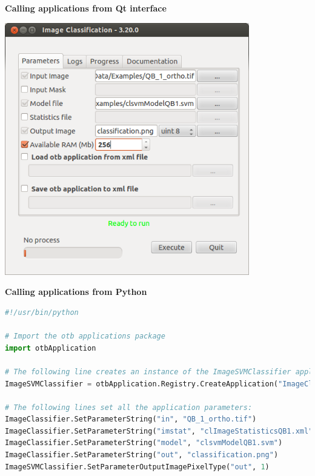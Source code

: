 \documentclass[portrait,a0]{a0poster}
\newenvironment{poster}{
  \begin{center}
  \begin{minipage}[c]{0.99\textwidth}
}{
  \end{minipage} 
  \end{center}
}
\newcommand{\titresubsection}[1]{ 
 	\begin{center}
 	\Large{\textbf{#1}}
 	\end{center}
 }
\begin{document}
\begin{poster}
\begin{minipage}[t]{\textwidth}
\begin{minipage}[t]{0.33\textwidth}
\begin{minipage}[t]{\textwidth}
\titresubsection{Calling applications from Qt interface}
\begin{center}
\includegraphics[width=0.8\textwidth]{Pictures/qt_app.png}
\end{center}
\end{minipage}

\vspace{1.5cm}

\begin{minipage}[t]{\textwidth}
\titresubsection{Calling applications from Python}
\begin{lstlisting}[language=python,breaklines=true,breakatwhitespace=true,frame = tb,framerule = 0.25pt,fontadjust,backgroundcolor={\color{listlightgray}},basicstyle = {\ttfamily\footnotesize},keywordstyle = {\ttfamily\color{listkeyword}\textbf},identifierstyle = {\ttfamily},commentstyle = {\ttfamily\color{listcomment}\textit},stringstyle = {\ttfamily},showstringspaces = false,showtabs = false,numbers = none,numbersep = 6pt, numberstyle={\ttfamily\color{listnumbers}},tabsize = 2]
#!/usr/bin/python

# Import the otb applications package
import otbApplication

# The following line creates an instance of the ImageSVMClassifier application 
ImageSVMClassifier = otbApplication.Registry.CreateApplication("ImageClassifier")

# The following lines set all the application parameters:
ImageClassifier.SetParameterString("in", "QB_1_ortho.tif")
ImageClassifier.SetParameterString("imstat", "clImageStatisticsQB1.xml")
ImageClassifier.SetParameterString("model", "clsvmModelQB1.svm")
ImageClassifier.SetParameterString("out", "classification.png")
ImageSVMClassifier.SetParameterOutputImagePixelType("out", 1)


\end{lstlisting}
\end{minipage}
\end{minipage}
\end{minipage}
\end{poster}
\end{document}
